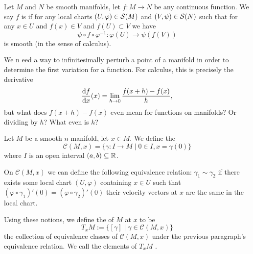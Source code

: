 

\begin{definition}
Let $M$ and $N$ be smooth manifolds, let $f\colon M\to N$ be any
continuous function. We say $f$ is  if for any local
charts $(U,\varphi)\in\mathcal{S}(M)$ and $(V,\psi)\in\mathcal{S}(N)$
such that for any $x\in U$ and $f(x)\in V$ and $f(U)\subset V$ we have
\begin{equation}
\psi\circ f\circ\varphi^{-1}\colon\varphi(U)\to\psi(f(V))
\end{equation}
is smooth (in the sense of calculus).
\end{definition}

\begin{node}
We n eed a way to infinitesimally perturb a point of a manifold in
order to determine the first variation for a function. For calculus,
this is precisely the derivative
\begin{equation}
\frac{\mathrm{d} f}{\mathrm{d} x}(x)=\lim_{h\to 0}\frac{f(x+h)-f(x)}{h},
\end{equation}
but what does $f(x+h)-f(x)$ even mean for functions on manifolds? Or
dividing by $h$? What even is $h$?
\end{node}

\begin{definition}
Let $M$ be a smooth $n$-manifold, let $x\in M$. We define the
\begin{equation}
\mathcal{C}(M,x)=\{\gamma\colon I\to M\mid 0\in I, x=\gamma(0)\}
\end{equation}
where $I$ is an open interval $(a,b)\subseteq\mathbb{R}$.

On $\mathcal{C}(M,x)$ we can define the following equivalence
relation: $\gamma_{1}\sim\gamma_{2}$ if there exists some local chart
$(U,\varphi)$ containing $x\in U$ such that
$(\varphi\circ\gamma_{1})'(0)=(\varphi\circ\gamma_{2})'(0)$ their
velocity vectors at $x$ are the same in the local chart.

Using these notions, we define the  of $M$ at
$x$ to be
\begin{equation}
T_{x}M:=\{[\gamma]\mid \gamma\in\mathcal{C}(M,x)\}
\end{equation}
the collection of equivalence classes of $\mathcal{C}(M,x)$ under the
previous paragraph's equivalence relation. We call the elements of
$T_{x}M$ .
\end{definition}

